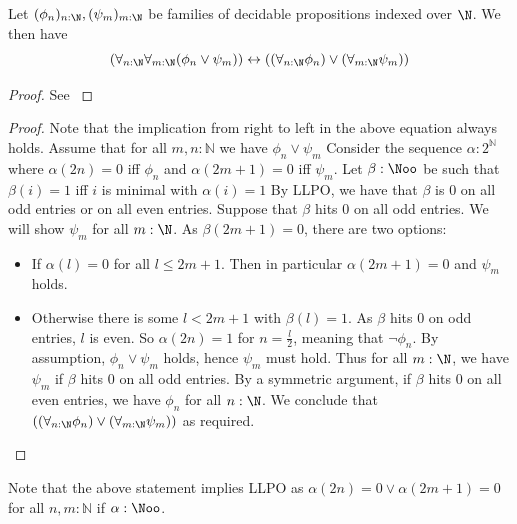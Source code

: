 \begin{lemma}\label{corAlternativeLLPO}
  Let $(\phi_n)_{n:\N}, (\psi_m)_{m:\N}$ be families of decidable propositions indexed over $\N$.
  We then have 
  \begin{equation}
    (\forall_{n:\N} \forall_{m:\N} (\phi_n \vee \psi_m) )
    \leftrightarrow
    ((\forall_{n:\N} \phi_n) \vee (\forall_{m:\N} \psi_m) )
  \end{equation}
\end{lemma}
\begin{proof}
  See \cite{HannesDiener, ReverseMathsBishop}
\end{proof}
\begin{proof}
  Note that the implication from right to left in the above equation always holds.
  Assume that for all $m,n:\mathbb N$ we have $\phi_n\vee \psi_m$ 
  Consider the sequence $\alpha:2^\mathbb N$ where $\alpha(2n) = 0$ iff $\phi_n$ and 
  $\alpha(2m+1) = 0$ iff $\psi_m$. 
  Let $\beta:\Noo$ be such that $\beta(i) = 1$ iff $i$ is minimal with $\alpha(i) = 1$
  By LLPO, we have that 
  $\beta$ is $0$ on all odd entries or on all even entries. 
  Suppose that $\beta$ hits $0$ on all odd entries. 
  We will show $\psi_m$ for all $m:\N$. 
  As $\beta(2m+1) = 0$, there are two options:
  \begin{itemize}
    	\item If $\alpha(l)=0$ for all $l\leq 2m+1$. Then in particular $\alpha(2m+1)=0$ and $\psi_m$ holds.
	\item Otherwise there is some $l<2m+1$ with $\beta(l) = 1$. 
  As $\beta$ hits $0$ on odd entries, $l$ is even. 
  So $\alpha(2n) = 1$ for $n = \frac{l}2$, meaning that $\neg \phi_n$. 
  By assumption, $\phi_n \vee \psi_m$ holds, hence $\psi_m$ must hold. 
  Thus for all $m:\N$, we have $\psi_m$ if $\beta$ hits $0$ on all odd entries. 
  By a symmetric argument, if $\beta$ hits $0$ on all even entries, we have $\phi_n$ for all $n:\N$. 
  We conclude that 
  $((\forall_{n:\N} \phi_n) \vee (\forall_{m:\N} \psi_m) )$ 
  as required. 
  \end{itemize}
\end{proof}

\begin{remark}
Note that the above statement implies LLPO as $\alpha(2n) =0 \vee \alpha(2m+1) =0$ for all $n,m:\mathbb N$ if $\alpha:\Noo$. 
\end{remark}
